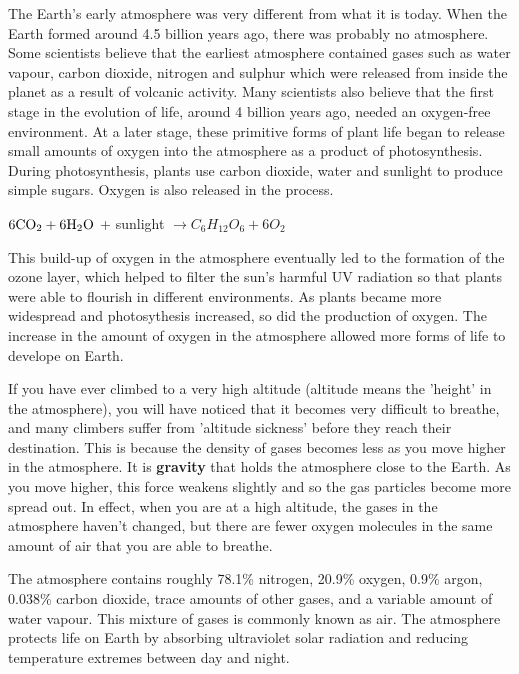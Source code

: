 \begin{IFact}

The Earth's early atmosphere was very different from what it is today. When the Earth formed around 4.5 billion years ago, there was probably no atmosphere. Some scientists believe that the earliest atmosphere contained gases such as water vapour, carbon dioxide, nitrogen and sulphur which were released from inside the planet as a result of volcanic activity. Many scientists also believe that the first stage in the evolution of life, around 4 billion years ago, needed an oxygen-free environment. At a later stage, these primitive forms of plant life began to release small amounts of oxygen into the atmosphere as a product of photosynthesis. During photosynthesis, plants use carbon dioxide, water and sunlight to produce simple sugars. Oxygen is also released in the process.

\begin{center}
$\rm{6CO_{2} + 6H_{2}O}$ + sunlight \rm${\rightarrow C_{6}H_{12}O_{6} + 6O_{2}}$
\end{center}

This build-up of oxygen in the atmosphere eventually led to the formation of the ozone layer, which helped to filter the sun's harmful UV radiation so that plants were able to flourish in different environments. As plants became more widespread and photosythesis increased, so did the production of oxygen. The increase in the amount of oxygen in the atmosphere allowed more forms of life to develope on Earth.

\end{IFact}

If you have ever climbed to a very high altitude (altitude means the 'height' in the atmosphere), you will have noticed that it becomes very difficult to breathe, and many climbers suffer from 'altitude sickness' before they reach their destination. This is because the density of gases becomes less as you move higher in the atmosphere. It is \textbf{gravity} that holds the atmosphere close to the Earth. As you move higher, this force weakens slightly and so the gas particles become more spread out. In effect, when you are at a high altitude, the gases in the atmosphere haven't changed, but there are fewer oxygen molecules in the same amount of air that you are able to breathe.

The atmosphere contains roughly 78.1\% nitrogen, 20.9\% oxygen, 0.9\% argon, 0.038\% carbon dioxide, trace amounts of other gases, and a variable amount of water vapour. This mixture of gases is commonly known as air. The atmosphere protects life on Earth by absorbing ultraviolet solar radiation and reducing temperature extremes between day and night.


